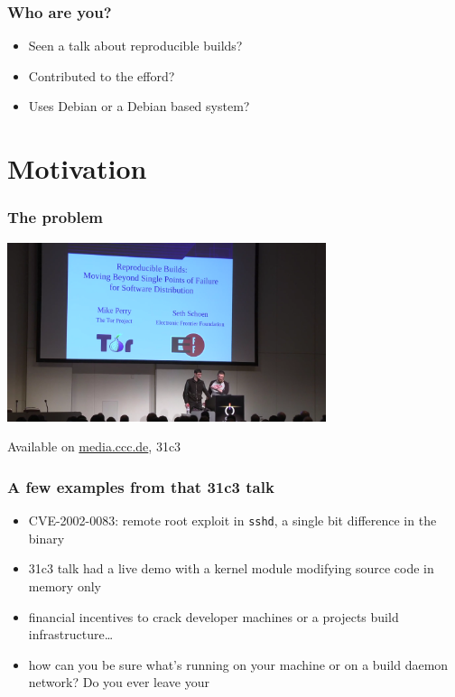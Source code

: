 \documentclass[14pt,aspectratio=169]{beamer}
\begin{document}
\begin{frame}
 \frametitle{Who are you?}
 \begin{itemize}
  \item<2-4> Seen a talk about reproducible builds?
  \item<3-4> Contributed to the efford?
  \item<3-4> Uses Debian or a Debian based system?
 \end{itemize}
\end{frame}


\section{Motivation}

\begin{frame}
 \frametitle{The problem}

 \begin{center}
  \includegraphics[width=0.7\textwidth]{images/31c3.png}

  Available on \url{media.ccc.de}, 31c3
 \end{center}
\end{frame}

\begin{frame}[fragile]
 \frametitle{A few examples from that 31c3 talk}
 \begin{itemize}
  \item CVE-2002-0083: remote root exploit in \texttt{sshd}, a single bit difference in the binary
  \item<2-5> 31c3 talk had a live demo with a kernel module modifying source code in memory only
  \item<3-5> financial incentives to crack developer machines or a projects
  build infrastructure…
  \item<4-5> {how can you be sure what's running on your machine or on a build
  daemon network? Do you ever leave your} 
 \end{itemize}
\end{frame}
\end{document}
